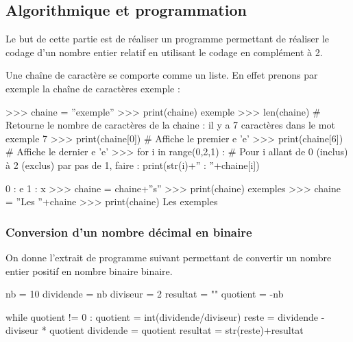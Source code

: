 \documentclass[10pt]{article}
\newif\ifprof
\begin{document}
\setcounter{subparagraph}{6}
%



\subsection{Algorithmique et programmation}
\ifprof
\else
Le but de cette partie est de réaliser un programme permettant de réaliser le codage d'un nombre entier relatif en utilisant le codage en complément à 2. 

\begin{py}
Une chaîne de caractère se comporte comme un liste. En effet prenons par exemple la chaîne de caractères \textsf{exemple} :

\begin{minipage}[c]{.95\linewidth}
\begin{python}
>>> chaine = ''exemple''
>>> print(chaine)
        exemple
>>> len(chaine)  # Retourne le nombre de caractères de la chaine : il y a 7 caractères dans le mot exemple
        7
>>> print(chaine[0]) # Affiche le premier e
        'e'
>>> print(chaine[6]) # Affiche le dernier e
        'e'
>>> for i in range(0,2,1) : # Pour i allant de 0 (inclus) à 2 (exclus) par pas de 1, faire : 
            print(str(i)+'' : ''+chaine[i])
            
        0 : e
        1 : x
>>> chaine = chaine+''s''
>>> print(chaine)
        exemples
>>> chaine = ''Les ''+chaine
>>> print(chaine)
        Les exemples
\end{python}
\end{minipage}
\end{py}
\fi
\subsubsection{Conversion d'un nombre décimal en binaire}
\ifprof
\else

On donne l'extrait de programme suivant permettant de convertir un nombre entier positif en nombre binaire binaire. 


\begin{py}
\begin{minipage}[c]{.5\linewidth}
\begin{python}
nb = 10
dividende = nb
diviseur = 2
resultat = ""
quotient = -nb
    
while quotient != 0 :
    quotient = int(dividende/diviseur)
    reste = dividende - diviseur * quotient
    dividende = quotient
    resultat = str(reste)+resultat
\end{python}
\end{minipage}
\end{py}
\fi
\end{document}
